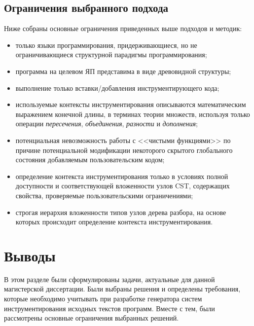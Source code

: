 \subsection{Ограничения выбранного подхода}

Ниже собраны основные ограничения приведенных выше подходов и методик:
\begin{itemize}[noitemsep]
  \item только языки программирования, придерживающиеся, но не ограничивающиеся структурной парадигмы программирования;
  \item программа на целевом ЯП представима в виде древовидной структуры;
  \item выполнение только вставки/добавления инструментирующего кода;
  \item используемые контексты инструментирования описываются математическим выражением конечной длины, в терминах теории множеств, используя только операции \textit{пересечения}, \textit{объединения}, \textit{разности} и \textit{дополнения};
  \item потенциальная невозможность работы с <<чистыми функциями>> по причине потенциальной модификации некоторого скрытого глобального состояния добавляемым пользовательским кодом;
  \item определение контекста инструментирования только в условиях полной доступности и соответствующей вложенности узлов CST, содержащих свойства, проверяемые пользовательскими ограничениями;
  \item строгая иерархия вложенности типов узлов дерева разбора, на основе которых происходит определение контекста инструментирования.
\end{itemize}

\section{Выводы}

В этом разделе были сформулированы задачи, актуальные для данной магистерской диссертации.
Были выбраны решения и определены требования, которые необходимо учитывать при разработке генератора систем инструментирования исходных текстов программ.
Вместе с тем, были рассмотрены основные ограничения выбранных решений.
